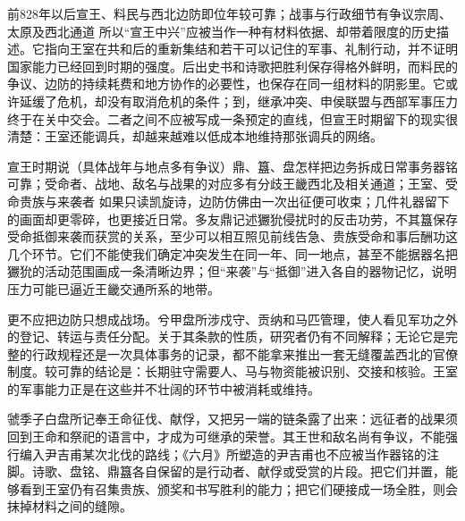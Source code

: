 \begin{event}{前828年以后}{宣王、料民与西北边防}{即位年较可靠；战事与行政细节有争议}{宗周、太原及西北通道}
所以“宣王中兴”应被当作一种有材料依据、却带着限度的历史描述。它指向王室在共和后的重新集结和若干可以记住的军事、礼制行动，并不证明国家能力已经回到时期的强度。后出史书和诗歌把胜利保存得格外鲜明，而料民的争议、边防的持续耗费和地方协作的必要性，也保存在同一组材料的阴影里。它或许延缓了危机，却没有取消危机的条件；到，继承冲突、申侯联盟与西部军事压力终于在关中交会。二者之间不应被写成一条预定的直线，但宣王时期留下的现实很清楚：王室还能调兵，却越来越难以低成本地维持那张调兵的网络。
\end{event}

\begin{event}{宣王时期说（具体战年与地点多有争议）}{鼎、簋、盘怎样把边务拆成日常事务}{器铭可靠；受命者、战地、敌名与战果的对应多有分歧}{王畿西北及相关通道；王室、受命贵族与来袭者}
如果只读凯旋诗，边防仿佛由一次出征便可收束；几件礼器留下的画面却更零碎，也更接近日常。多友鼎记述玁狁侵扰时的反击功劳，不其簋保存受命抵御来袭而获赏的关系，至少可以相互照见前线告急、贵族受命和事后酬功这几个环节。它们不能使我们确定冲突发生在同一年、同一地点，甚至不能据器名把玁狁的活动范围画成一条清晰边界；但“来袭”与“抵御”进入各自的器物记忆，说明压力可能已逼近王畿交通所系的地带。

更不应把边防只想成战场。兮甲盘所涉戍守、贡纳和马匹管理，使人看见军功之外的登记、转运与责任分配。关于其条款的性质，研究者仍有不同解释；无论它是完整的行政规程还是一次具体事务的记录，都不能拿来推出一套无缝覆盖西北的官僚制度。较可靠的结论是：长期驻守需要人、马与物资能被识别、交接和核验。王室的军事能力正是在这些并不壮阔的环节中被消耗或维持。

虢季子白盘所记奉王命征伐、献俘，又把另一端的链条露了出来：远征者的战果须回到王命和祭祀的语言中，才成为可继承的荣誉。其王世和敌名尚有争议，不能强行编入尹吉甫某次北伐的路线；《六月》所塑造的尹吉甫也不应被当作器铭的注脚。诗歌、盘铭、鼎簋各自保留的是行动者、献俘或受赏的片段。把它们并置，能够看到王室仍有召集贵族、颁奖和书写胜利的能力；把它们硬接成一场全胜，则会抹掉材料之间的缝隙。
\end{event}

